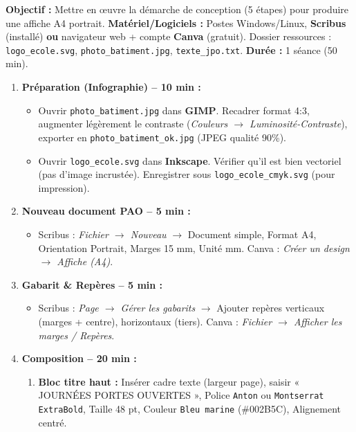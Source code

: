 \documentclass[11pt]{article}
\begin{document}
\begin{experience}
\textbf{Objectif :} Mettre en œuvre la démarche de conception (5 étapes) pour produire une affiche A4 portrait.
\textbf{Matériel/Logiciels :} Postes Windows/Linux, \textbf{Scribus} (installé) \textbf{ou} navigateur web + compte \textbf{Canva} (gratuit). Dossier ressources : \texttt{logo\_ecole.svg}, \texttt{photo\_batiment.jpg}, \texttt{texte\_jpo.txt}.
\textbf{Durée :} 1 séance (50 min).

\begin{enumerate}
\item \textbf{Préparation (Infographie) -- 10 min :}
\begin{itemize}
\item Ouvrir \texttt{photo\_batiment.jpg} dans \textbf{GIMP}. Recadrer format 4:3, augmenter légèrement le contraste (\textit{Couleurs $\rightarrow$ Luminosité-Contraste}), exporter en \texttt{photo\_batiment\_ok.jpg} (JPEG qualité 90\%).
\item Ouvrir \texttt{logo\_ecole.svg} dans \textbf{Inkscape}. Vérifier qu'il est bien vectoriel (pas d'image incrustée). Enregistrer sous \texttt{logo\_ecole\_cmyk.svg} (pour impression).
\end{itemize}
\item \textbf{Nouveau document PAO -- 5 min :}
\begin{itemize}
\item Scribus : \textit{Fichier $\rightarrow$ Nouveau} $\rightarrow$ Document simple, Format A4, Orientation Portrait, Marges 15 mm, Unité mm. Canva : \textit{Créer un design $\rightarrow$ Affiche (A4)}.
\end{itemize}
\item \textbf{Gabarit \& Repères -- 5 min :}
\begin{itemize}
\item Scribus : \textit{Page $\rightarrow$ Gérer les gabarits} $\rightarrow$ Ajouter repères verticaux (marges + centre), horizontaux (tiers). Canva : \textit{Fichier $\rightarrow$ Afficher les marges / Repères}.
\end{itemize}
\item \textbf{Composition -- 20 min :}
\begin{enumerate}
\item \textbf{Bloc titre haut :} Insérer cadre texte (largeur page), saisir « JOURNÉES PORTES OUVERTES », Police \texttt{Anton} ou \texttt{Montserrat ExtraBold}, Taille 48 pt, Couleur \texttt{Bleu marine} (\#002B5C), Alignement centré.

\end{enumerate}
\end{enumerate}
\end{experience}
\end{document}
